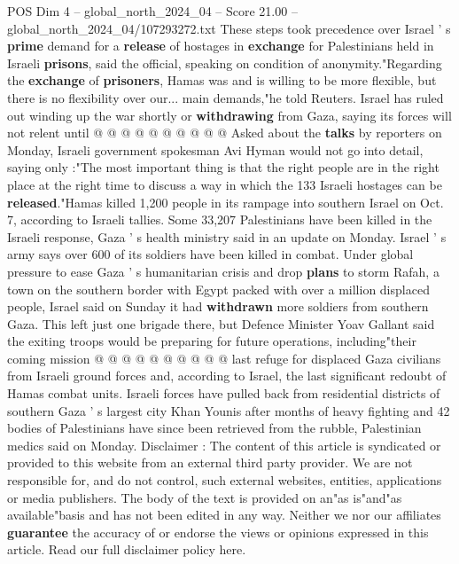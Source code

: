 \begin{textsample}{POS Dim 4 – global\_north\_2024\_04 – Score 21.00 – global\_north\_2024\_04/107293272.txt}
These steps took precedence over Israel ' s \textbf{prime} demand for a \textbf{release} of hostages in \textbf{exchange} for Palestinians held in Israeli \textbf{prisons}, said the official, speaking on condition of anonymity."Regarding the \textbf{exchange} of \textbf{prisoners}, Hamas was and is willing to be more flexible, but there is no flexibility over our... main demands,"he told Reuters.
Israel has ruled out winding up the war shortly or \textbf{withdrawing} from Gaza, saying its forces will not relent until @ @ @ @ @ @ @ @ @ @ Asked about the \textbf{talks} by reporters on Monday, Israeli government spokesman Avi Hyman would not go into detail, saying only :"The most important thing is that the right people are in the right place at the right time to discuss a way in which the 133 Israeli hostages can be \textbf{released}."Hamas killed 1,200 people in its rampage into southern Israel on Oct. 7, according to Israeli tallies.
Some 33,207 Palestinians have been killed in the Israeli response, Gaza ' s health ministry said in an update on Monday.
Israel ' s army says over 600 of its soldiers have been killed in combat.
Under global pressure to ease Gaza ' s humanitarian crisis and drop \textbf{plans} to storm Rafah, a town on the southern border with Egypt packed with over a million displaced people, Israel said on Sunday it had \textbf{withdrawn} more soldiers from southern Gaza.
This left just one brigade there, but Defence Minister Yoav Gallant said the exiting troops would be preparing for future operations, including"their coming mission @ @ @ @ @ @ @ @ @ @ last refuge for displaced Gaza civilians from Israeli ground forces and, according to Israel, the last significant redoubt of Hamas combat units.
Israeli forces have pulled back from residential districts of southern Gaza ' s largest city Khan Younis after months of heavy fighting and 42 bodies of Palestinians have since been retrieved from the rubble, Palestinian medics said on Monday.
Disclaimer : The content of this article is syndicated or provided to this website from an external third party provider.
We are not responsible for, and do not control, such external websites, entities, applications or media publishers.
The body of the text is provided on an"as is"and"as available"basis and has not been edited in any way.
Neither we nor our affiliates \textbf{guarantee} the accuracy of or endorse the views or opinions expressed in this article.
Read our full disclaimer policy here.

\end{textsample}
